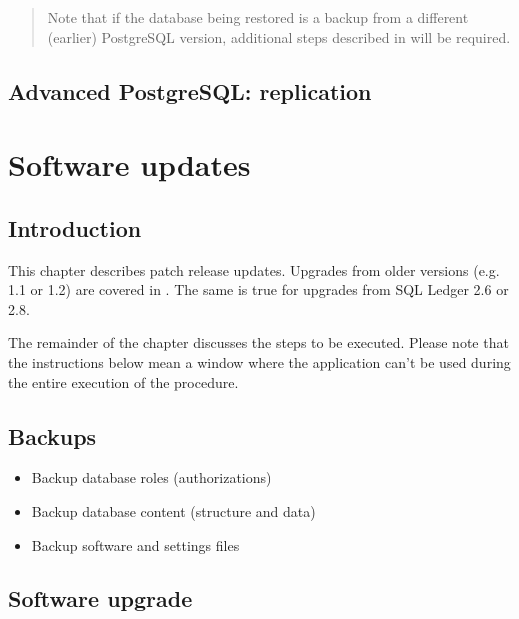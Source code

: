 \begin{quote}
Note that if the database being restored is a backup from a different (earlier) PostgreSQL version,
additional steps described in  will be required.
\end{quote}




\section{Advanced PostgreSQL: replication}
\label{sec-contingency-replication}


\chapter{Software updates}
\label{cha-software-updates}

\section{Introduction}
\label{sec-updates-introduction}

This chapter describes patch release updates. Upgrades from older versions (e.g. 1.1 or 1.2)
are covered in . The same is true for upgrades from SQL Ledger 2.6 or 2.8.

The remainder of the chapter discusses the steps to be executed. Please note that the instructions
below mean a window where the application can't be used during the entire execution of the procedure.

\section{Backups}
\label{sec-updates-backups}

\begin{itemize}
\item Backup database roles (authorizations)
\item Backup database content (structure and data)
\item Backup software and settings files
\end{itemize}



\section{Software upgrade}
\label{sec-updates-software-upgrades}

